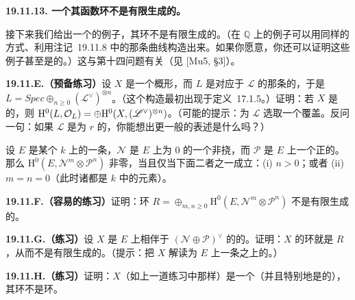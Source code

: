 \textbf{19.11.13. 一个其函数环不是有限生成的\trVariety。}

接下来我们给出一个\trComplex\trVariety{}的例子，其\trGlobalSections{}环不是有限生成的。（在 $\mathbb{Q}$ 上的例子可以用同样的方式、利用\mbox{注记~19.11.8} 中的那条曲线构造出来。如果你愿意，你还可以证明这些例子甚至是\trQuasiaffine{}的。）这与\trHilbert{}第十四问题有关（见 [Mu5, \S3]）。

\textbf{19.11.E.（预备练习）}\quad 设 $X$ 是一个概形，而 $L$ 是对应于\trInvertibleSheaf{} $\mathscr{L}$ 的那条\trLineBundle{}的\trTotalSpace，于是 $L=\mathit{Spec}\oplus_{n\ge0}(\mathscr{L}^{\vee})^{\otimes n}$。（这个构造最初出现于\mbox{定义~17.1.5}。）证明：若 $X$ 是\trQuasicompact{}的，则 $\mathrm{H}^0(L,\mathcal{O}_L)=\oplus\mathrm{H}^0(X,(\mathscr{L}^{\vee})^{\otimes n})$。（可能的提示：为 $\mathscr{L}$ 选取一个\trTrivialization{}覆盖。反问一句：如果 $\mathscr{L}$ 是\trRank{}为 $r$ 的\trLocallyFreeSheaf，你能想出更一般的表述是什么吗？）

设 $E$ 是某个\trBaseField{} $k$ 上的一条\trEllipticCurve，$\mathscr{N}$ 是 $E$ 上\trDegree{}为 $0$ 的一个非挠\trInvertibleSheaf，而 $\mathscr{P}$ 是 $E$ 上一个正\trDegree{}的\trInvertibleSheaf。那么 $\mathrm{H}^0(E,\mathscr{N}^m\otimes\mathscr{P}^n)$ 非零，当且仅当下面二者之一成立：(i) $n>0$；或者 (ii) $m=n=0$（此时诸\trSection{}都是 $k$ 中的元素）。

\textbf{19.11.F.（容易的练习）}\quad 证明：环 $R=\oplus_{m,n\ge0}\mathrm{H}^0(E,\mathscr{N}^m\otimes\mathscr{P}^n)$ 不是有限生成的。

\textbf{19.11.G.（练习）}\quad 设 $X$ 是 $E$ 上相伴于 $(\mathscr{N}\oplus\mathscr{P})^{\vee}$ 的\trVectorBundle{}的\trTotalSpace。证明：$X$ 的\trGlobalSections{}环就是 $R$，从而不是有限生成的。（提示：把 $X$ 解读为 $E$ 上一条\trLineBundle{}之上的\trLineBundle。）

\textbf{19.11.H.（练习）}\quad 证明：$X$（如上一道练习中那样）是一个\trVariety（并且特别地是\trNoetherian{}的），其\trGlobalSections{}环不是\trNoetherian{}环。
